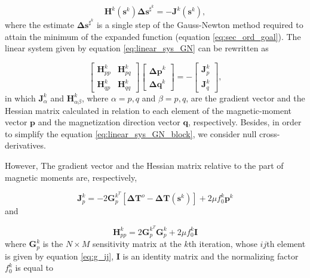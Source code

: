 \begin{equation}
\mathbf{H}^k (\mathbf{s}^{k}) \mathbf{\Delta s}^{\sharp^k} = - \mathbf{J}^k (\mathbf{s}^k),
\label{eq:linear_sys_GN}
\end{equation}
where the estimate $\mathbf{\Delta s}^{\sharp^k}$ is a single step of the Gauss-Newton method required to attain the minimum of the expanded function (equation \ref{eq:sec_ord_goal}). The linear system given by equation \ref{eq:linear_sys_GN} can be rewritten as 

\begin{equation}
\left[
\begin{array}{c|c}
\mathbf{H}_{pp}^{k} & \mathbf{H}_{pq}^{k} \\
\hline
\mathbf{H}_{qp}^{k}& \mathbf{H}_{qq}^{k}
\end{array}
\right] \left[ \begin{array}{c}
\mathbf{\Delta p}^k \\ 
\mathbf{\Delta q}^k 
\end{array} \right] = -\left[ \begin{array}{c}
\mathbf{J}_{p}^{k} \\ 
\mathbf{J}_{q}^{k} 
\end{array} \right] ,
\label{eq:linear_sys_GN_block}
\end{equation}
in which $\mathbf{J}_{\alpha}^{k}$ and $\mathbf{H}_{\alpha \beta}^{k}$, where $\alpha = p,q$ and $\beta = p,q$, are the gradient vector and the Hessian matrix calculated in relation to each element of the magnetic-moment vector $\mathbf{p}$ and the magnetization direction vector $\mathbf{q}$, respectively. Besides, in order to simplify the equation \ref{eq:linear_sys_GN_block}, we consider null cross-derivatives. 

However, The gradient vector and the Hessian matrix relative to the part of magnetic moments are, respectively,

\begin{equation}
\mathbf{J}_{p}^{k} = -2 \mathbf{G}_{p}^{k^T} [ \mathbf{\Delta T}^o -  \mathbf{\Delta T} (\mathbf{s}^k) ] + 2\mu f_{0}^{k} \mathbf{p}^k 
\label{eq:grad_p}
\end{equation}   
and   

\begin{equation}
\mathbf{H}_{pp}^{k} = 2 \mathbf{G}_{p}^{k^T} \mathbf{G}_{p}^{k} + 2 \mu f_{0}^{k} \mathbf{I} 
\label{eq:hess_p}
\end{equation}
where $\mathbf{G}_p^{k}$ is the $N \times M$ sensitivity matrix at the $k$th iteration, whose $ij$th element is given by equation \ref{eq:g_ij}, $\mathbf{I}$ is an identity matrix and the normalizing factor $f_{0}^{k}$ is equal to

